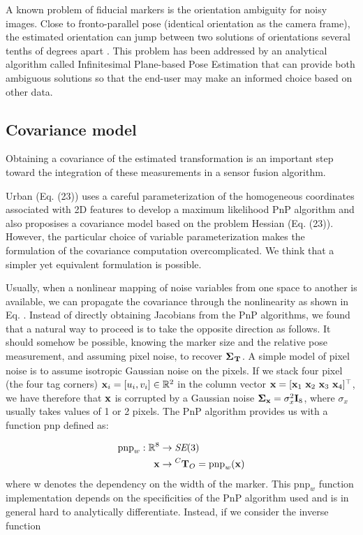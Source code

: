 A known problem of fiducial markers is the orientation ambiguity for noisy images. Close to fronto-parallel pose (identical orientation as 
the camera frame), the estimated orientation can jump between two solutions of orientations several tenths of degrees apart 
\cite{collins2014infinitesimal}. 
This problem has been addressed by an analytical algorithm called Infinitesimal Plane-based Pose Estimation \cite{collins2014infinitesimal} that can 
provide both ambiguous solutions so that the end-user may make an informed choice based on other data.

\subsection{Covariance model}
Obtaining a covariance of the estimated transformation is an important step toward the integration of these measurements in a sensor fusion algorithm.

Urban \cite{urban2016mlpnp} (Eq. (23)) uses a careful parameterization of the homogeneous coordinates associated with 2D features to develop
a maximum likelihood PnP algorithm and also proposises a covariance model based on the problem Hessian (Eq. (23)).  However, the particular choice of variable parameterization makes the formulation of the covariance computation overcomplicated.
We think that a simpler yet equivalent formulation is possible. 

Usually, when a nonlinear mapping of noise variables from one space to another is available, we can propagate the covariance through the nonlinearity
as shown in Eq. .  
Instead of directly obtaining Jacobians from the PnP algorithms, we found that a natural way to proceed is to take the opposite 
direction as follows. It should somehow be possible, knowing the marker size and the relative pose measurement, and assuming pixel noise, to
recover ${\bm \Sigma}_{\prescript{}{}{{\bf T}}_{}}$. A simple model of pixel noise is to assume isotropic Gaussian noise on the pixels. If we stack four pixel (the four tag corners) 
${\bf x}_i = [u_i, v_i] \in \mathbb{R}^2$ in the column vector ${\bf x} = [{\bf x}_1~{\bf x}_2~{\bf x}_3~{\bf x}_4]^{\top}$, we have therefore that
${\bf x}$ is corrupted by a Gaussian noise ${\bm \Sigma}_{{\bf x}} = \sigma_{x}^2 {\bf I}_8$, where $\sigma_{x}$ usually takes values of 1 or 2 pixels.
The PnP algorithm provides us with a function $\text{pnp}$ defined as:

\begin{equation}
    \begin{split}
        \text{pnp}_w: \mathbb{R}^8 &\rightarrow \textit{SE}(3) \\
                           {\bf x} &\rightarrow \prescript{C}{}{{\bf T}}_{O} = \text{pnp}_w({\bf x})
    \end{split}
\end{equation}
%
where w denotes the dependency on the width of the marker. This $\text{pnp}_w$ function implementation depends on the specificities of the PnP algorithm used and  
is in general hard to analytically differentiate. Instead, if we consider the inverse function

